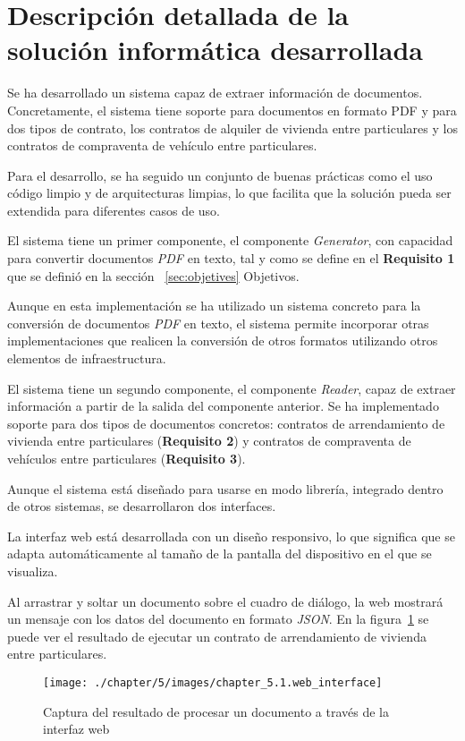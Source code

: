 \section{Descripción detallada de la solución informática desarrollada}

Se ha desarrollado un sistema capaz de extraer información de documentos.
Concretamente, el sistema tiene soporte para documentos en formato PDF y para dos tipos de contrato, los contratos de
alquiler de vivienda entre particulares y los contratos de compraventa de vehículo entre particulares.

Para el desarrollo, se ha seguido un conjunto de buenas prácticas como el uso código limpio y de arquitecturas limpias,
lo que facilita que la solución pueda ser extendida para diferentes casos de uso.

El sistema tiene un primer componente, el componente \textit{Generator}, con capacidad para convertir documentos
\textit{PDF} en texto, tal y como se define en el \textbf{Requisito 1} que se definió en la sección~
\ref{sec:objetives} Objetivos.

Aunque en esta implementación se ha utilizado un sistema concreto para la conversión de documentos \textit{PDF}
en texto, el sistema permite incorporar otras implementaciones que realicen la conversión de otros formatos utilizando
otros elementos de infraestructura.

El sistema tiene un segundo componente, el componente \textit{Reader}, capaz de extraer información a partir de la
salida del componente anterior.
Se ha implementado soporte para dos tipos de documentos concretos: contratos de arrendamiento de vivienda entre
particulares (\textbf{Requisito 2}) y contratos de compraventa de vehículos entre particulares (\textbf{Requisito 3}).

Aunque el sistema está diseñado para usarse en modo librería, integrado dentro de otros sistemas, se desarrollaron dos
interfaces.

La interfaz web está desarrollada con un diseño responsivo, lo que significa que se adapta automáticamente al tamaño de
la pantalla del dispositivo en el que se visualiza.

Al arrastrar y soltar un documento sobre el cuadro de diálogo, la web mostrará un mensaje con los datos del documento en
formato \textit{JSON}.
En la figura~\ref{fig:chapter_5.1.web_interface} se puede ver el resultado de ejecutar un contrato de arrendamiento
de vivienda entre particulares.

\begin{figure}[ht]
    \begin{center}
        \texttt{[image: ./chapter/5/images/chapter\_5.1.web\_interface]}
        \caption{Captura del resultado de procesar un documento a través de la interfaz web}
        \label{fig:chapter_5.1.web_interface}
    \end{center}
\end{figure}

